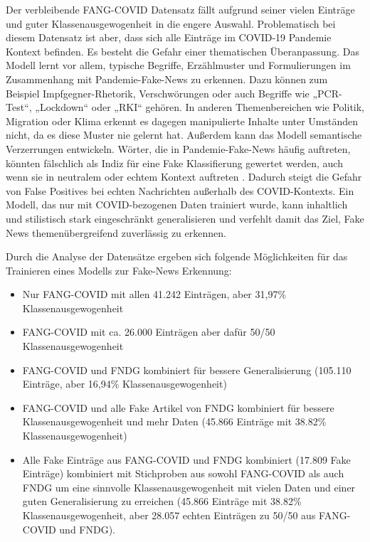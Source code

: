 Der verbleibende FANG-COVID Datensatz \cite{mattern-etal-2021-fang} fällt aufgrund seiner vielen Einträge und guter Klassenausgewogenheit
in die engere Auswahl. Problematisch bei diesem Datensatz ist aber, dass sich alle Einträge im COVID-19 Pandemie Kontext befinden.
Es besteht die Gefahr einer thematischen Überanpassung. Das Modell lernt vor allem, typische Begriffe, Erzählmuster und 
Formulierungen im Zusammenhang mit Pandemie-Fake-News zu erkennen. Dazu können zum Beispiel Impfgegner-Rhetorik, Verschwörungen oder auch Begriffe 
wie „PCR-Test“, „Lockdown“ oder „RKI“ gehören. In anderen Themenbereichen wie Politik, Migration oder Klima erkennt es dagegen manipulierte Inhalte 
unter Umständen nicht, da es diese Muster nie gelernt hat.
Außerdem kann das Modell semantische Verzerrungen entwickeln. Wörter, die in Pandemie-Fake-News häufig auftreten, könnten fälschlich als 
Indiz für eine Fake Klassifierung gewertet werden, auch wenn sie in neutralem oder echtem Kontext auftreten \cite{chen2023, nan2022improvingfakenewsdetection}. 
Dadurch steigt die Gefahr von False Positives bei echten Nachrichten außerhalb des COVID-Kontexts.
Ein Modell, das nur mit COVID-bezogenen Daten trainiert wurde, kann inhaltlich und stilistisch stark eingeschränkt generalisieren und 
verfehlt damit das Ziel, Fake News themenübergreifend zuverlässig zu erkennen.

Durch die Analyse der Datensätze ergeben sich folgende Möglichkeiten für das Trainieren eines Modells zur Fake-News Erkennung:
\begin{itemize}
    \item Nur FANG-COVID mit allen 41.242 Einträgen, aber 31,97\% Klassenausgewogenheit
    \item FANG-COVID mit ca. 26.000 Einträgen aber dafür 50/50 Klassenausgewogenheit
    \item FANG-COVID und FNDG kombiniert für bessere Generalisierung (105.110 Einträge, aber 16,94\% Klassenausgewogenheit)
    \item FANG-COVID und alle Fake Artikel von FNDG kombiniert für bessere Klassenausgewogenheit und mehr Daten
    (45.866 Einträge mit 38.82\% Klassenausgewogenheit)
    \item Alle Fake Einträge aus FANG-COVID und FNDG kombiniert (17.809 Fake Einträge) kombiniert mit Stichproben aus sowohl FANG-COVID als auch FNDG
    um eine sinnvolle Klassenausgewogenheit mit vielen Daten und einer guten Generalisierung zu erreichen (45.866 Einträge mit 38.82\% Klassenausgewogenheit,
    aber 28.057 echten Einträgen zu 50/50 aus FANG-COVID und FNDG).
\end{itemize}